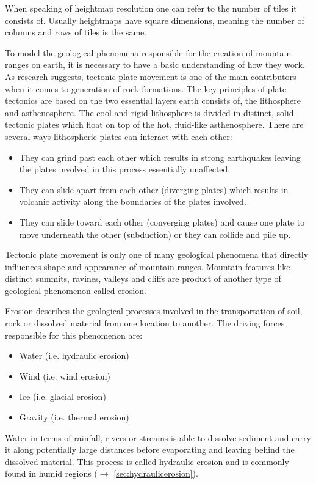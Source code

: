 \documentclass[11pt,a4paper,twoside,openright]{report}
\begin{document}
When speaking of heightmap resolution one can refer to the number of tiles it consists of. Usually heightmaps have square dimensions, meaning the number of columns and rows of tiles is the same.

To model the geological phenomena responsible for the creation of mountain ranges on earth, it is necessary to have a basic understanding of how they work. As research suggests, tectonic plate movement is one of the main contributors when it comes to generation of rock formations. The key principles of plate tectonics are based on the two essential layers earth consists of, the lithosphere and asthenosphere. The cool and rigid lithosphere is divided in distinct, solid tectonic plates which float on top of the hot, fluid-like asthenosphere. There are several ways lithospheric plates can interact with each other:
\begin{itemize}
  \item They can grind past each other which results in strong earthquakes leaving the plates involved in this process essentially unaffected.
  \item They can slide apart from each other (diverging plates) which results in volcanic activity along the boundaries of the plates involved.
  \item They can slide toward each other (converging plates) and cause one plate to move underneath the other (subduction) or they can collide and pile up.
\end{itemize}
Tectonic plate movement is only one of many geological phenomena that directly influences shape and appearance of mountain ranges. Mountain features like distinct summits, ravines, valleys and cliffs are product of another type of geological phenomenon called erosion.

Erosion describes the geological processes involved in the transportation of soil, rock or dissolved material from one location to another. The driving forces responsible for this phenomenon are:
\begin{itemize}
  \item Water (i.e. hydraulic erosion)
  \item Wind (i.e. wind erosion)
  \item Ice (i.e. glacial erosion)
  \item Gravity (i.e. thermal erosion)
\end{itemize}

Water in terms of rainfall, rivers or streams is able to dissolve sediment and carry it along potentially large distances before evaporating and leaving behind the dissolved material. This process is called hydraulic erosion and is commonly found in humid regions ($\rightarrow$ \cref{sec:hydraulicerosion}).
\end{document}
